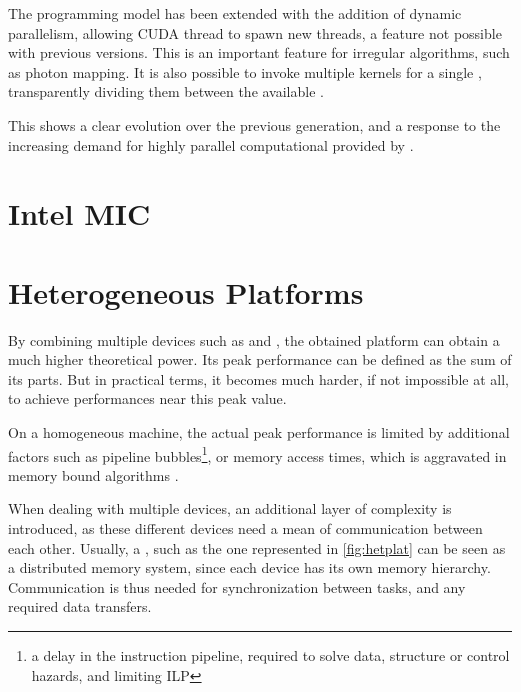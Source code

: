 \documentclass[main.tex]{subfiles}
\begin{document}

The programming model has been extended with the addition of dynamic parallelism, allowing \acs{CUDA} thread to spawn new threads, a feature not possible with previous versions. This is an important feature for irregular algorithms, such as photon mapping. It is also possible to invoke multiple kernels for a single \gpu, transparently dividing them between the available \smxs.

This shows a clear evolution over the previous generation, and a response to the increasing demand for highly parallel computational provided by \gpus.


\section{Intel MIC}


\section{Heterogeneous Platforms}

By combining multiple devices such as \cpus and \gpus, the obtained platform can obtain a much higher theoretical power. Its peak performance can be defined as the sum of its parts. But in practical terms, it becomes much harder, if not impossible at all, to achieve performances near this peak value.

On a homogeneous machine, the actual peak performance is limited by additional factors such as pipeline bubbles\footnote{a delay in the instruction pipeline, required to solve data, structure or control hazards, and limiting \ac{ILP} }, or memory access times, which is aggravated in memory bound algorithms \cite{williams2009roofline}.

When dealing with multiple devices, an additional layer of complexity is introduced, as these different devices need a mean of communication between each other. Usually, a \hetplat, such as the one represented in \cref{fig:hetplat} can be seen as a distributed memory system, since each device has its own memory hierarchy. Communication is thus needed for synchronization between tasks, and any required data transfers.

\end{document}
